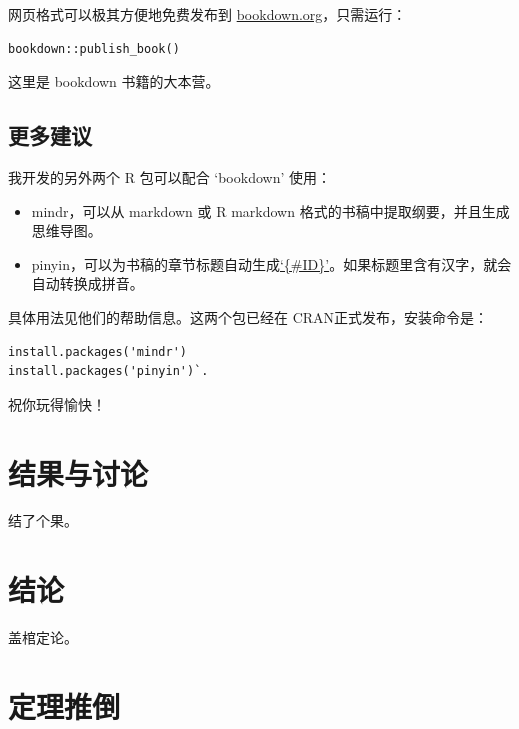 \documentclass[doublesided]{Style/ucasthesis}%
\begin{document}
网页格式可以极其方便地免费发布到 \href{https://bookdown.org}{bookdown.org}，只需运行：

\begin{verbatim}
bookdown::publish_book()
\end{verbatim}

这里是 bookdown 书籍的大本营。

\hypertarget{ux66f4ux591aux5efaux8bae}{%
\section{更多建议}\label{ux66f4ux591aux5efaux8bae}}

我开发的另外两个 R 包可以配合 `bookdown' 使用：

\begin{itemize}
\item
  mindr，可以从 markdown 或 R markdown 格式的书稿中提取纲要，并且生成思维导图。
\item
  pinyin，可以为书稿的章节标题自动生成\href{https://bookdown.org/yihui/bookdown/cross-references.html}{`\{\#ID\}'}。如果标题里含有汉字，就会自动转换成拼音。
\end{itemize}

具体用法见他们的帮助信息。这两个包已经在 CRAN正式发布，安装命令是：

\begin{verbatim}
install.packages('mindr')
install.packages('pinyin')`.
\end{verbatim}

祝你玩得愉快！

\hypertarget{results}{%
\chapter{结果与讨论}\label{results}}

结了个果。

\hypertarget{conclusion}{%
\chapter{结论}\label{conclusion}}

盖棺定论。

\appendix

\hypertarget{ux5b9aux7406ux63a8ux5012}{%
\chapter{定理推倒}\label{ux5b9aux7406ux63a8ux5012}}

\raggedbottom
\end{document}
